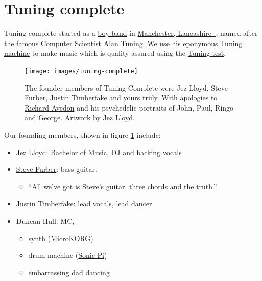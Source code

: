 \documentclass[
  12pt,
]{book}
\providecommand{\tightlist}{%
  \setlength{\itemsep}{0pt}\setlength{\parskip}{0pt}}
\begin{document}
\hypertarget{tuningcomplete}{%
\section{Tuning complete}\label{tuningcomplete}}

Tuning complete started as a \href{https://en.wikipedia.org/wiki/Boy_band}{boy band} in \href{https://duncan.hull.name/2019/07/05/mancashire/}{Manchester, Lancashire 🌹}, named after the famous Computer Scientist \href{https://en.wikipedia.org/wiki/Alan_Turing}{Alan Tuning}. We use his eponymous \href{https://en.wikipedia.org/wiki/Turing_machine}{Tuning machine} to make music which is quality assured using the \href{https://en.wikipedia.org/wiki/Turing_test}{Tuning test}.

\begin{figure}

{\centering \texttt{[image: images/tuning-complete]} 

}

\caption{The founder members of Tuning Complete were Jez Lloyd, Steve Furber, Justin Timberfake and yours truly. With apologies to \href{https://en.wikipedia.org/wiki/Richard_Avedon}{Richard Avedon} and his psychedelic portraits of John, Paul, Ringo and George. Artwork by Jez Lloyd.}\label{fig:beatles-fig}
\end{figure}



Our founding members, shown in figure \ref{fig:beatles-fig} include:

\begin{itemize}
\tightlist
\item
  \href{https://www.linkedin.com/in/jez-lloyd-84077069}{Jez Lloyd}: Bachelor of Music, DJ and backing vocals
\item
  \href{https://en.wikipedia.org/wiki/Steve_Furber}{Steve Furber}: bass guitar.

  \begin{itemize}
  \tightlist
  \item
    ``All we've got is Steve's guitar, \href{https://en.wikipedia.org/wiki/Three_Chords_and_the_Truth}{three chords and the truth}.'' \citep{harlan, allalongthewatchtower}
  \end{itemize}
\item
  \href{https://en.wikipedia.org/wiki/Justin_Timberlake}{Justin Timberfake}: lead vocals, lead dancer \citep{cantstopthefeeling}
\item
  Duncan Hull: MC,

  \begin{itemize}
  \tightlist
  \item
    synth (\href{https://en.wikipedia.org/wiki/MicroKORG}{MicroKORG})
  \item
    drum machine (\href{https://sonic-pi.net/}{Sonic Pi})
  \item
    embarrassing dad dancing \citep{daddancing}
  \end{itemize}
\end{itemize}
\end{document}
